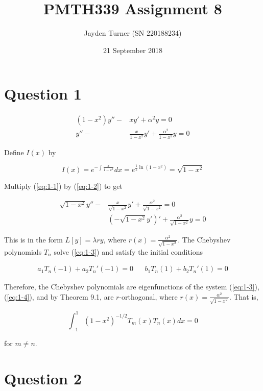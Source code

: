 \documentclass{article}
\title{PMTH339 Assignment 8}
\date{21 September 2018}
\author{Jayden Turner (SN 220188234)}
\begin{document}
\maketitle
{}

\section*{Question 1}

\begin{align}
    (1 - x^2)y'' -& xy' + \alpha^2y = 0\nonumber\\
    y'' -& \frac{x}{1 - x^2}y' + \frac{\alpha^2}{1 - x^2}y = 0 \label{eq:1-1}
\end{align}

Define $I(x)$ by

\begin{equation} \label{eq:1-2}
    I(x) = e^{-\int \frac{x}{1 - x^2}}dx = e^{\frac{1}{2}\ln(1 - x^2)} = \sqrt{1 - x^2}
\end{equation}

Multiply (\ref{eq:1-1}) by (\ref{eq:1-2}) to get

\begin{align}
    \sqrt{1 - x^2}y'' -& \frac{x}{\sqrt{1 - x^2}}y' + \frac{\alpha^2}{\sqrt{1 - x^2}} = 0\nonumber\\
    &(-\sqrt{1 - x^2}y')' + \frac{\alpha^2}{\sqrt{1 - x^2}}y = 0 \label{eq:1-3}
\end{align}

This is in the form $L[y] = \lambda ry$, where $r(x) = \frac{\alpha^2}{\sqrt{1 - x^2}}$.
The Chebyshev polynomials $T_n$ solve (\ref{eq:1-3}) and satisfy the initial conditions

\begin{align} \label{eq:1-4}
    a_1T_n(-1) + a_2T_n'(-1) = 0 && b_1T_n(1) + b_2T_n'(1) = 0
\end{align}

Therefore, the Chebyshev polynomials are eigenfunctions of the system (\ref{eq:1-3}), (\ref{eq:1-4}),
and by Theorem 9.1, are $r$-orthogonal, where $r(x) = \frac{\alpha^2}{\sqrt{1 - x^2}}$. That is,

\begin{equation*}
    \int_{-1}^1 (1 - x^2)^{-1/2}T_m(x)T_n(x) dx = 0
\end{equation*}

for $m \neq n$.

\section*{Question 2}
\end{document}
